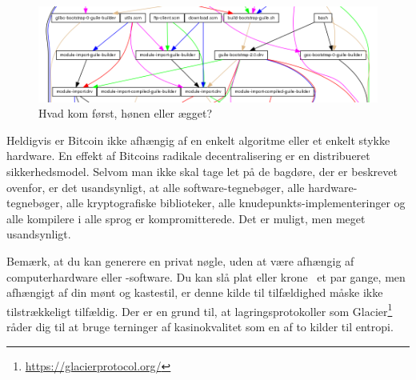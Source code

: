 \documentclass[paper=6in:9in,pagesize=pdftex,
               headinclude=on,footinclude=on,12pt]{scrbook}
\begin{document}
\begin{figure}
  \includegraphics{assets/images/guix-bootstrap-dependencies.png}
  \caption{Hvad kom først, hønen eller ægget?}
  \label{fig:guix-bootstrap-dependencies}
\end{figure}

Heldigvis er Bitcoin ikke afhængig af en enkelt algoritme eller et enkelt stykke hardware. En effekt af Bitcoins radikale decentralisering er en distribueret sikkerhedsmodel. Selvom man ikke skal tage let på de bagdøre, der er beskrevet ovenfor, er det usandsynligt, at alle software-tegnebøger, alle hardware-tegnebøger, alle kryptografiske biblioteker, alle knudepunkts-implementeringer og alle kompilere i alle sprog er kompromitterede. Det er muligt, men meget usandsynligt.

Bemærk, at du kan generere en privat nøgle, uden at være afhængig af computerhardware eller -software. Du kan slå plat eller krone~\cite{antonopoulos2014mastering} et par gange, men afhængigt af din mønt og kastestil, er denne kilde til tilfældighed måske ikke tilstrækkeligt tilfældig. Der er en grund til, at lagringsprotokoller som Glacier\footnote{\url{https://glacierprotocol.org/}} råder dig til at bruge terninger af kasinokvalitet som en af to kilder til entropi.
\end{document}

